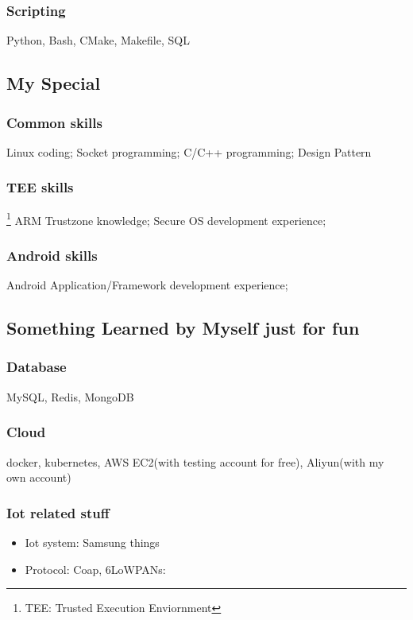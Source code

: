 \documentclass{article}
\begin{document}
\subsubsection{Scripting}
Python, Bash, CMake, Makefile, SQL

\subsection{My Special}

\subsubsection {Common skills}
Linux coding; Socket programming; C/C++ programming; Design Pattern

\subsubsection {TEE skills} \footnote{TEE: Trusted Execution Enviornment}
ARM Trustzone knowledge; Secure OS development experience;

\subsubsection {Android skills}
Android Application/Framework development experience;

\subsection {Something Learned by Myself just for fun}
\subsubsection {Database}
MySQL, Redis, MongoDB

\subsubsection {Cloud}
docker, kubernetes, AWS EC2(with testing account for free), Aliyun(with my own account)

\subsubsection{Iot related stuff}
\begin{itemize}
\item[1] Iot system: Samsung things
\item[2] Protocol: Coap, 6LoWPANs:
\end{itemize}
\end{document}
